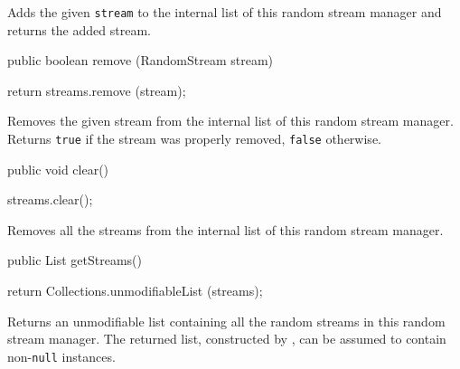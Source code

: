\begin{tabb}   Adds the given \texttt{stream} to the internal list of
 this random stream manager and returns the added stream.
\end{tabb}
\begin{htmlonly}
\end{htmlonly}
\begin{code}

   public boolean remove (RandomStream stream)\begin{hide} {
      return streams.remove (stream);
   }\end{hide}
\end{code}
\begin{tabb}   Removes the given stream from the internal list of this random
 stream manager.  Returns \texttt{true} if the stream was
 properly removed, \texttt{false} otherwise.
\end{tabb}
\begin{htmlonly}
\end{htmlonly}
\begin{code}

   public void clear()\begin{hide} {
      streams.clear();
   }\end{hide}
\end{code}
\begin{tabb}   Removes all the streams from the internal list
 of this random stream manager.
\end{tabb}
\begin{code}

   public List getStreams()\begin{hide} {
      return Collections.unmodifiableList (streams);
   }\end{hide}
\end{code}
\begin{tabb}   Returns an unmodifiable list containing all the
 random streams in this random
 stream manager.  The returned list, constructed by
 , can be assumed
 to contain non-\texttt{null}  instances.
\end{tabb}
\begin{htmlonly}
\end{htmlonly}

